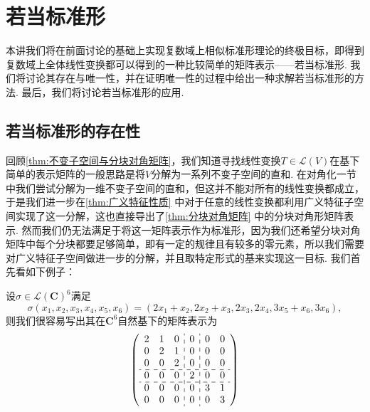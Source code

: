 \chapter{若当标准形}

本讲我们将在前面讨论的基础上实现复数域上相似标准形理论的终极目标，即得到复数域上全体线性变换都可以得到的一种比较简单的矩阵表示——若当标准形. 我们将讨论其存在与唯一性，并在证明唯一性的过程中给出一种求解若当标准形的方法. 最后，我们将讨论若当标准形的应用.

\section{若当标准形的存在性}
回顾\autoref{thm:不变子空间与分块对角矩阵}，我们知道寻找线性变换$T\in\mathcal{L}(V)$在基下简单的表示矩阵的一般思路是将$V$分解为一系列不变子空间的直和. 在对角化一节中我们尝试分解为一维不变子空间的直和，但这并不能对所有的线性变换都成立，于是我们进一步在\autoref{thm:广义特征性质} 中对于任意的线性变换都利用广义特征子空间实现了这一分解，这也直接导出了\autoref{thm:分块对角矩阵} 中的分块对角形矩阵表示. 然而我们仍无法满足于将这一矩阵表示作为标准形，因为我们还希望分块对角矩阵中每个分块都要足够简单，即有一定的规律且有较多的零元素，所以我们需要对广义特征子空间做进一步的分解，并且取特定形式的基来实现这一目标. 我们首先看如下例子：

\begin{example}{}{}
    设$\sigma\in\mathcal{L}(\mathbf{C})^6$满足
    \[\sigma(x_1,x_2,x_3,x_4,x_5,x_6)=(2x_1+x_2,2x_2+x_3,2x_3,2x_4,3x_5+x_6,3x_6),\]
    则我们很容易写出其在$\mathbf{C}^6$自然基下的矩阵表示为
    \[\left(\begin{array}{ccc:c:cc}
                2 & 1 & 0 & 0 & 0 & 0 \\
                0 & 2 & 1 & 0 & 0 & 0 \\
                0 & 0 & 2 & 0 & 0 & 0 \\
                \hdashline
                0 & 0 & 0 & 2 & 0 & 0 \\
                \hdashline
                0 & 0 & 0 & 0 & 3 & 1 \\
                0 & 0 & 0 & 0 & 0 & 3 \\
            \end{array}\right)\]
\end{example}

